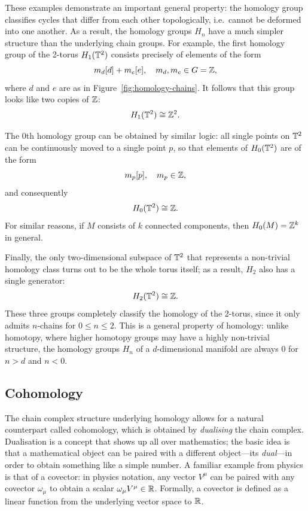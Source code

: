 These examples demonstrate an important general property: the homology group classifies cycles that differ from each other topologically, i.e.\ cannot be deformed into one another. As a result, the homology groups $H_n$ have a much simpler structure than the underlying chain groups. For example, the first homology group of the 2-torus $H_1(\mathbb{T}^2)$ consists precisely of elements of the form
\begin{equation*}
	m_d[d] + m_e[e],\quad m_d,m_e\in G=\mathbb{Z},
\end{equation*}
where $d$ and $e$ are as in Figure~\ref{fig:homology-chains}. It follows that this group looks like two copies of $\mathbb{Z}$:
\begin{equation*}
	H_1(\mathbb{T}^2) \cong \mathbb{Z}^2.
\end{equation*}

The 0th homology group can be obtained by similar logic: all single points on $\mathbb{T}^2$ can be continuously moved to a single point $p$, so that elements of $H_0(\mathbb{T}^2)$ are of the form
\begin{equation*}
	m_p[p],\quad m_p\in\mathbb{Z},
\end{equation*}
and consequently
\begin{equation*}
	H_0(\mathbb{T}^2) \cong \mathbb{Z}.
\end{equation*}
For similar reasons, if $M$ consists of $k$ connected components, then $H_0(M) = \mathbb{Z}^k$ in general.

Finally, the only two-dimensional subspace of $\mathbb{T}^2$ that represents a non-trivial homology class turns out to be the whole torus itself; as a result, $H_2$ also has a single generator:
\begin{equation*}
	H_2(\mathbb{T}^2) \cong \mathbb{Z}.
\end{equation*}
These three groups completely classify the homology of the 2-torus, since it only admits $n$-chains for $0\leq n\leq 2$. This is a general property of homology: unlike homotopy, where higher homotopy groups may have a highly non-trivial structure, the homology groups $H_n$ of a $d$-dimensional manifold are always 0 for $n>d$ and $n<0$.


\subsection{Cohomology}\label{sec:cohomology}

The chain complex structure underlying homology allows for a natural counterpart called cohomology, which is obtained by \emph{dualising} the chain complex. Dualisation is a concept that shows up all over mathematics; the basic idea is that a mathematical object can be paired with a different object---its \emph{dual}---in order to obtain something like a simple number. A familiar example from physics is that of a covector: in physics notation, any vector $V^\mu$ can be paired with any covector $\omega_\mu$ to obtain a scalar $\omega_\mu V^\mu\in\mathbb{R}$. Formally, a covector is defined as a linear function from the underlying vector space to $\mathbb{R}$.

